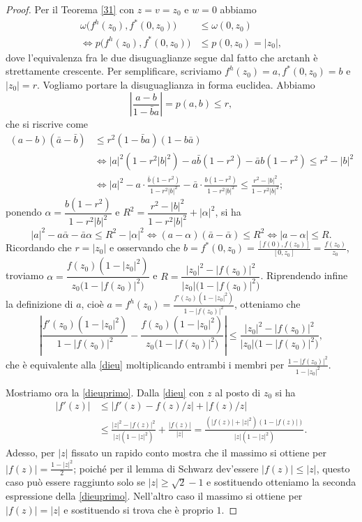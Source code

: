 \begin{proof}
  Per il Teorema \ref{31} con $z=v=z_0$ e $w=0$ abbiamo
  \begin{align*}
    \omega\bigl(f^h(z_0),f^*(0,z_0)\bigr) & \le \omega(0,z_0) \\
    \iff p\bigl(f^h(z_0),f^*(0,z_0)\bigr) & \le p(0,z_0)=|z_0|,
  \end{align*}
  dove l'equivalenza fra le due disuguaglianze segue dal fatto che $\text{arctanh}$ è strettamente crescente. Per semplificare, scriviamo $f^h(z_0)=a, f^*(0,z_0)=b$ e $|z_0|=r$. Vogliamo portare la disuguaglianza in forma euclidea. Abbiamo
  $$\left|\frac{a-b}{1-\bar{b}a}\right|=p(a,b) \le r,$$
  che si riscrive come
  \begin{align*}
    (a-b)(\bar{a}-\bar{b}) & \le r^2(1-\bar{b}a)(1-b\bar{a}) \\
    & \iff |a|^2(1-r^2|b|^2)-a\bar{b}(1-r^2)-\bar{a}b(1-r^2) \le r^2-|b|^2 \\
    & \iff |a|^2-a\cdot\frac{\bar{b}(1-r^2)}{1-r^2|b|^2}-\bar{a}\cdot\frac{b(1-r^2)}{1-r^2|b|^2} \le \frac{r^2-|b|^2}{1-r^2|b|^2};
  \end{align*}
  ponendo $\alpha=\dfrac{b(1-r^2)}{1-r^2|b|^2}$ e $R^2=\dfrac{r^2-|b|^2}{1-r^2|b|^2}+|\alpha|^2$, si ha
  $$|a|^2-a\bar{\alpha}-\bar{a}\alpha \le R^2-|\alpha|^2 \iff (a-\alpha)(\bar{a}-\bar{\alpha}) \le R^2\iff |a-\alpha| \le R.$$
  Ricordando che $r=|z_0|$ e osservando che $b=f^*(0,z_0)=\frac{[f(0),f(z_0)]}{[0,z_0]}=\frac{f(z_0)}{z_0}$, troviamo $\alpha=\dfrac{f(z_0)(1-|z_0|^2)}{z_0\bigl(1-|f(z_0)|^2\bigr)}$ e $R=\dfrac{|z_0|^2-|f(z_0)|^2}{|z_0|\bigl(1-|f(z_0)|^2\bigr)}$.
  Riprendendo infine la definizione di $a$, cioè $a=f^h(z_0)=\frac{f'(z_0)(1-|z_0|^2)}{1-|f(z_0)|^2}$, otteniamo che
  $$\left|\frac{f'(z_0)(1-|z_0|^2)}{1-|f(z_0)|^2}-\frac{f(z_0)(1-|z_0|^2)}{z_0\bigl(1-|f(z_0)|^2\bigr)}\right| \le \frac{|z_0|^2-|f(z_0)|^2}{|z_0|\bigl(1-|f(z_0)|^2\bigr)},$$
  che è equivalente alla \eqref{dieu} moltiplicando entrambi i membri per $\frac{1-|f(z_0)|^2}{1-|z_0|^2}$.

  Mostriamo ora la \eqref{dieuprimo}. Dalla \eqref{dieu} con $z$ al posto di $z_0$ si ha
  \begin{align*}
    |f'(z)| & \le |f'(z)-f(z)/z|+|f(z)/z| \\
    & \le \frac{|z|^2-|f(z)|^2}{|z|(1-|z|^2)}+\frac{|f(z)|}{|z|}=\frac{(|f(z)|+|z|^2)(1-|f(z)|)}{|z|(1-|z|^2)}.
  \end{align*}
  Adesso, per $|z|$ fissato un rapido conto mostra che il massimo si ottiene per $|f(z)|=\frac{1-|z|^2}{2}$; poiché per il lemma di Schwarz dev'essere $|f(z)| \le |z|$, questo caso può essere raggiunto solo se $|z| \ge \sqrt{2}-1$ e sostituendo otteniamo la seconda espressione della \eqref{dieuprimo}. Nell'altro caso il massimo si ottiene per $|f(z)|=|z|$ e sostituendo si trova che è proprio $1$.
\end{proof}

